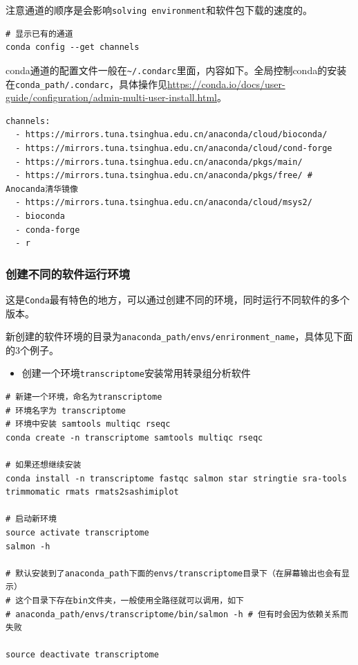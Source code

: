 \documentclass[]{article}
\providecommand{\tightlist}{%
  \setlength{\itemsep}{0pt}\setlength{\parskip}{0pt}}
\numberwithin{figure}{section}
\numberwithin{table}{section}
\begin{document}
注意通道的顺序是会影响\texttt{solving\ environment}和软件包下载的速度的。

\begin{verbatim}
# 显示已有的通道
conda config --get channels
\end{verbatim}

conda通道的配置文件一般在\texttt{\textasciitilde{}/.condarc}里面，内容如下。全局控制conda的安装在\texttt{conda\_path/.condarc}，具体操作见\url{https://conda.io/docs/user-guide/configuration/admin-multi-user-install.html}。

\begin{verbatim}
channels:
  - https://mirrors.tuna.tsinghua.edu.cn/anaconda/cloud/bioconda/
  - https://mirrors.tuna.tsinghua.edu.cn/anaconda/cloud/cond-forge
  - https://mirrors.tuna.tsinghua.edu.cn/anaconda/pkgs/main/
  - https://mirrors.tuna.tsinghua.edu.cn/anaconda/pkgs/free/ # Anocanda清华镜像
  - https://mirrors.tuna.tsinghua.edu.cn/anaconda/cloud/msys2/
  - bioconda
  - conda-forge
  - r
\end{verbatim}

\hypertarget{conda_environment}{%
\subsubsection{创建不同的软件运行环境}\label{conda_environment}}

这是\texttt{Conda}最有特色的地方，可以通过创建不同的环境，同时运行不同软件的多个版本。

新创建的软件环境的目录为\texttt{anaconda\_path/envs/enrironment\_name}，具体见下面的3个例子。

\begin{itemize}
\tightlist
\item
  创建一个环境\texttt{transcriptome}安装常用转录组分析软件
\end{itemize}

\begin{verbatim}
# 新建一个环境，命名为transcriptome
# 环境名字为 transcriptome
# 环境中安装 samtools multiqc rseqc
conda create -n transcriptome samtools multiqc rseqc

# 如果还想继续安装
conda install -n transcriptome fastqc salmon star stringtie sra-tools trimmomatic rmats rmats2sashimiplot

# 启动新环境
source activate transcriptome
salmon -h

# 默认安装到了anaconda_path下面的envs/transcriptome目录下（在屏幕输出也会有显示）
# 这个目录下存在bin文件夹，一般使用全路径就可以调用，如下
# anaconda_path/envs/transcriptome/bin/salmon -h # 但有时会因为依赖关系而失败

source deactivate transcriptome
\end{verbatim}
\end{document}
